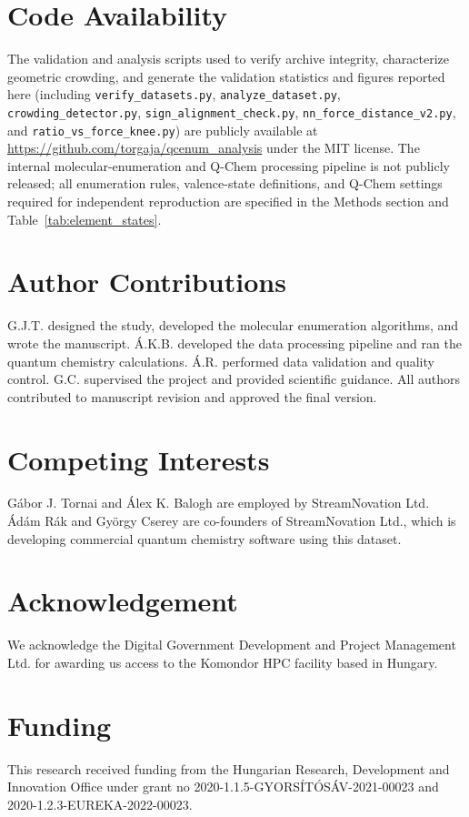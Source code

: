 \documentclass[fleqn,10pt]{article}
\begin{document}
\section*{Code Availability}
The validation and analysis scripts used to verify archive integrity, characterize geometric crowding, and generate the validation statistics and figures reported here (including \texttt{verify\_datasets.py}, \texttt{analyze\_dataset.py}, \texttt{crowding\_detector.py}, \texttt{sign\_alignment\_check.py}, \texttt{nn\_force\_distance\_v2.py}, and \texttt{ratio\_vs\_force\_knee.py}) are publicly available at \url{https://github.com/torgaja/qcenum_analysis} under the MIT license. The internal molecular-enumeration and Q-Chem processing pipeline is not publicly released; all enumeration rules, valence-state definitions, and Q-Chem settings required for independent reproduction are specified in the Methods section and Table~\ref{tab:element_states}.



 



\section*{Author Contributions}

G.J.T. designed the study, developed the molecular enumeration algorithms, and wrote the manuscript. Á.K.B. developed the data processing pipeline and ran the quantum chemistry calculations. Á.R. performed data validation and quality control. G.C. supervised the project and provided scientific guidance. All authors contributed to manuscript revision and approved the final version.

\section*{Competing Interests}
Gábor J. Tornai and Álex K. Balogh are employed by StreamNovation Ltd. Ádám Rák and György Cserey are co-founders of StreamNovation Ltd., which is developing commercial quantum chemistry software using this dataset.

\section*{Acknowledgement}
We acknowledge the Digital Government Development and Project Management Ltd. for awarding us access to the Komondor HPC facility based in Hungary.

\section*{Funding}

This research received funding from the Hungarian Research, Development and Innovation Office under grant no 2020-1.1.5-GYORSÍTÓSÁV-2021-00023 and 2020-1.2.3-EUREKA-2022-00023.
\end{document}
